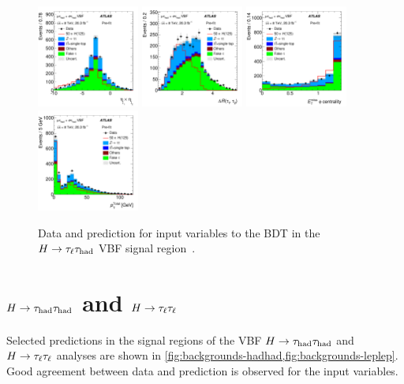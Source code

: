 \begin{figure}[tp]
  \includegraphics[width=0.30\textwidth]{figures/HIGG-2013-32/figaux_06e}
  \includegraphics[width=0.30\textwidth]{figures/HIGG-2013-32/figaux_06f}
  \includegraphics[width=0.30\textwidth]{figures/HIGG-2013-32/figaux_07a}
  \includegraphics[width=0.30\textwidth]{figures/HIGG-2013-32/figaux_07b}
  \caption{Data and prediction for input variables to the BDT in the $H\rightarrow\tau_\ell\tau_\text{had}$ VBF signal region~\cite{HIGG-2013-32}.}
  \label{fig:results-SR-inputs}
\end{figure}

\clearpage

\section{$H\rightarrow\tau_\text{had}\tau_\text{had}$ and $H\rightarrow\tau_\ell\tau_\ell$}
\label{sec:backgrounds-hhll}

Selected predictions in the signal regions of the VBF $H\rightarrow\tau_\text{had}\tau_\text{had}$ and $H\rightarrow\tau_\ell\tau_\ell$ analyses are shown in \cref{fig:backgrounds-hadhad,fig:backgrounds-leplep}. Good agreement between data and prediction is observed for the input variables.

